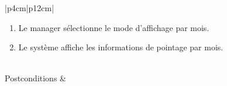 \begin{longtable}{|p{4cm}|p{12cm}|}
\begin{minipage}[t]{\linewidth}
                                \begin{enumerate}[ nosep,after=\strut, ]
                                      \item Le manager sélectionne le mode d’affichage par mois. 
                                      \item Le système affiche les informations de pointage par mois.
                                \end{enumerate}
                            \end{minipage}
                        \\
                        \hline
                        Postconditions &   \\
                        \hline
                        \caption{Description du cas d'utilisation « Consulter feuille de pointage d'un employé »}\\
            \end{longtable}    
        
